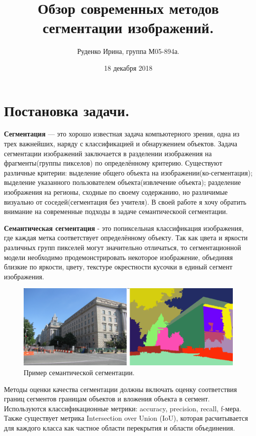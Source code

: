 \documentclass{article}
\title{Обзор современных методов сегментации изображений.}
\author{Руденко Ирина, группа М05-894а.}
\date{18 декабря 2018}
\begin{document}
\maketitle

\section{Постановка задачи.}
\textbf{Сегментация} — это хорошо известная задача компьютерного зрения, одна из трех важнейших, наряду с классификацией и обнаружением объектов. Задача сегментации изображений заключается в разделении изображения на фрагменты(группы пикселов) по определённому критерию. Существуют различные критерии: выделение общего объекта на изображении(ко-сегментация); выделение указанного пользователем объекта(извлечение объекта); разделение изображения на регионы, сходные по своему содержанию, но различимые визуально от соседей(сегментация без учителя). В своей работе я хочу обратить внимание на современные подходы в задаче семантическоой сегментации.

\textbf{Семантическая сегментация} - это попиксельная классификация изображения, где каждая метка соответствует определённому объекту. Так как цвета и яркости различных групп пикселей могут значительно отличаться, то сегментационной модели необходимо продемонстрировать некоторое  изображение, объединяя близкие по яркости, цвету, текстуре окрестности кусочки в  единый сегмент изображения.

\begin{figure}[h!]
\includegraphics[width=\linewidth]{seg1.png}
\caption{Пример семантической сегментации.}
\end{figure}

Методы оценки качества сегментации должны включать оценку соответствия границ сегментов границам объектов и вложения объекта в сегмент. Используются классификационные метрики: accuracy, precision, recall, f-мера. Также существует метрика Intersection over Union (IoU), которая расчитывается для каждого класса как частное области перекрытия и области объединения.
\end{document}
